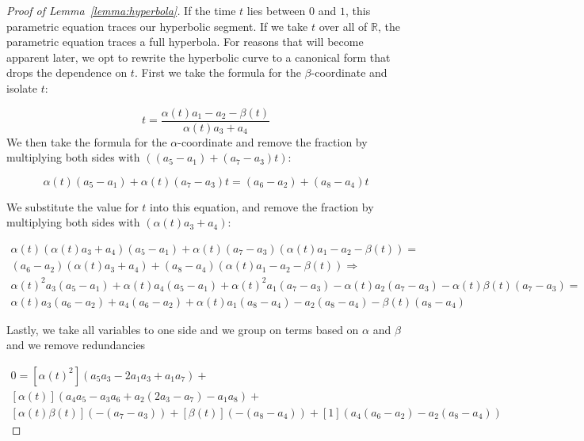 \documentclass[a4paper, UKenglish]{lipics-v2018}
\begin{document}
\begin{proof}[Proof of Lemma~\ref{lemma:hyperbola}]
  If the time $t$ lies between $0$ and $1$, this parametric equation traces our hyperbolic segment. If we take $t$ over all of $\mathbb{R}$, the parametric equation traces a full hyperbola. For reasons that will become apparent later, we opt to rewrite the hyperbolic curve to a canonical form that drops the dependence on $t$. First we take the formula for the $\beta$-coordinate and isolate $t$:
  
  \[
     t = \frac{\alpha(t) a_1 - a_2  - \beta(t)}{\alpha(t) a_3 + a_4}
  \]
We then take the formula for the $\alpha$-coordinate and remove the fraction by multiplying both sides with $ ((a_5 - a_1)  + (a_7 - a_3) t)$:

\[ 
\alpha(t)(a_5 - a_1)  + \alpha(t)(a_7 - a_3) t = (a_6 - a_2) + (a_8 - a_4) t
\]

We substitute the value for $t$ into this equation, and remove the fraction by multiplying both sides with $(\alpha(t) a_3 + a_4)$:

\begin{align*}
\alpha(t)(\alpha(t) a_3 + a_4)(a_5 - a_1)  + \alpha(t)(a_7 - a_3) (\alpha(t) a_1 - a_2  - \beta(t)) = \\
(a_6 - a_2)(\alpha(t) a_3 + a_4) + (a_8 - a_4) (\alpha(t) a_1 - a_2  - \beta(t)) \Rightarrow \\
\alpha(t)^2a_3(a_5 - a_1) + \alpha(t)a_4(a_5 - a_1)  + \alpha(t)^2a_1(a_7 - a_3)
- \alpha(t)a_2(a_7 - a_3)  - \alpha(t)\beta(t)(a_7 - a_3) = \\
\alpha(t) a_3(a_6 - a_2) + a_4(a_6 - a_2) + \alpha(t)a_1(a_8 - a_4) - a_2 (a_8 - a_4) - \beta(t)(a_8 - a_4) 
\end{align*}

Lastly, we take all variables to one side and we group on terms based on $\alpha$ and $\beta$ and we remove redundancies

\begin{align}
\label{eq:hyperbola}
    0= [\alpha(t)^2](a_5 a_3 -2 a_1 a_3 + a_1 a_7)+ \\
    [\alpha(t)](a_4 a_5 - a_3 a_6 + a_2 (2 a_3 - a_7) - a_1 a_8) + \\
    [\alpha(t)\beta(t)](-(a_7 - a_3)) + [\beta(t)](-(a_8 - a_4)) + [1](a_4(a_6 - a_2)- a_2 (a_8 - a_4))
\end{align}
\end{proof}
\end{document}
